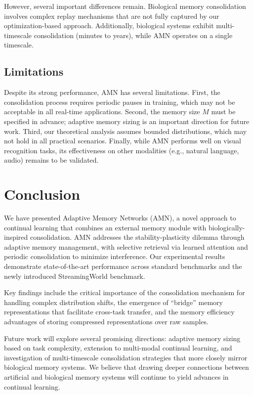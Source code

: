 \documentclass[11pt]{article}
\begin{document}
However, several important differences remain. Biological memory consolidation involves complex replay mechanisms that are not fully captured by our optimization-based approach. Additionally, biological systems exhibit multi-timescale consolidation (minutes to years), while AMN operates on a single timescale.

\subsection{Limitations}

Despite its strong performance, AMN has several limitations. First, the consolidation process requires periodic pauses in training, which may not be acceptable in all real-time applications. Second, the memory size $M$ must be specified in advance; adaptive memory sizing is an important direction for future work. Third, our theoretical analysis assumes bounded distributions, which may not hold in all practical scenarios. Finally, while AMN performs well on visual recognition tasks, its effectiveness on other modalities (e.g., natural language, audio) remains to be validated.

\section{Conclusion}
\label{sec:conclusion}

We have presented Adaptive Memory Networks (AMN), a novel approach to continual learning that combines an external memory module with biologically-inspired consolidation. AMN addresses the stability-plasticity dilemma through adaptive memory management, with selective retrieval via learned attention and periodic consolidation to minimize interference. Our experimental results demonstrate state-of-the-art performance across standard benchmarks and the newly introduced StreamingWorld benchmark.

Key findings include the critical importance of the consolidation mechanism for handling complex distribution shifts, the emergence of ``bridge'' memory representations that facilitate cross-task transfer, and the memory efficiency advantages of storing compressed representations over raw samples.

Future work will explore several promising directions: adaptive memory sizing based on task complexity, extension to multi-modal continual learning, and investigation of multi-timescale consolidation strategies that more closely mirror biological memory systems. We believe that drawing deeper connections between artificial and biological memory systems will continue to yield advances in continual learning.
\end{document}
